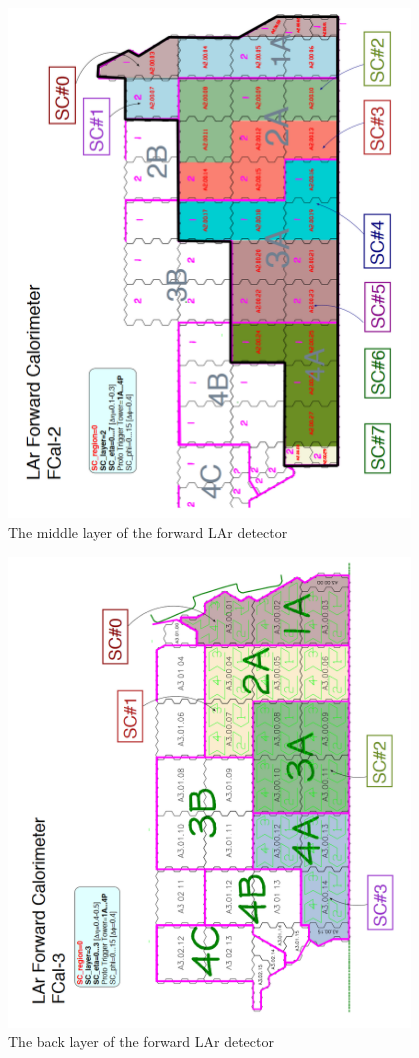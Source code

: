 \begin{figure}[ht]
	\centering
	\includegraphics[width=0.95\textwidth]{Chapter6/FCAL2.png}
	\caption{The middle layer of the forward LAr detector}
\end{figure}
\begin{figure}[ht]
	\centering
	\includegraphics[width=0.95\textwidth]{Chapter6/FCAL3.png}
	\caption{The back layer of the forward LAr detector}
\end{figure}